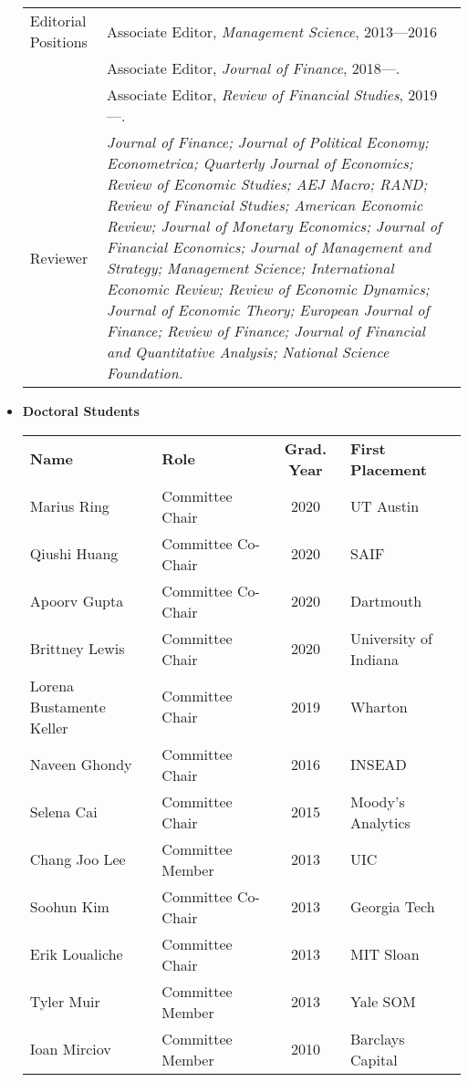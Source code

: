 \documentclass[11pt,letterpaper,serif,overlapped]{res}
\begin{document}
\begin{resume}
\begin{itemize}
\begin{longtable}{lp{11.5cm}}
Editorial Positions & Associate Editor, \emph{Management Science}, 2013---2016\\
  &Associate Editor, \emph{Journal of Finance}, 2018---.\\
  &Associate Editor, \emph{Review of Financial Studies}, 2019---.\\[0.2cm]

Reviewer&
\emph{Journal of Finance; Journal of Political Economy; Econometrica; Quarterly Journal of Economics; Review of Economic Studies; AEJ Macro; RAND;  Review of Financial Studies; American Economic Review;  Journal of Monetary Economics; Journal of Financial Economics; Journal of Management and Strategy; Management Science;  International Economic Review; Review of Economic Dynamics;   Journal of Economic Theory;   European Journal of Finance;   Review of Finance; Journal of Financial and Quantitative Analysis; National Science Foundation.}\\[0.2cm]

 \end{longtable}

\vspace{0.5cm}

\item \textbf{Doctoral Students}\\
\begin{longtable}{llcl}
\textbf{Name} & \textbf{Role} & \textbf{Grad. Year }& \textbf{First Placement}\\
Marius Ring &   Committee Chair & 2020 & UT Austin \\
Qiushi Huang & Committee Co-Chair & 2020 & SAIF\\
Apoorv Gupta  & Committee Co-Chair & 2020 & Dartmouth\\
Brittney Lewis  &Committee Chair & 2020 & University of Indiana  \\
Lorena Bustamente Keller & Committee Chair & 2019& Wharton \\
Naveen Ghondy  &  Committee Chair &2016 & INSEAD \\
Selena Cai  &  Committee Chair &2015 & Moody's Analytics\\
Chang Joo Lee   &  Committee Member &2013 & UIC \\
Soohun Kim   &  Committee  Co-Chair  &2013 & Georgia Tech \\
Erik Loualiche & Committee  Chair&2013    & MIT Sloan \\
Tyler Muir&   Committee Member  &2013& Yale  SOM\\
Ioan Mirciov  & Committee Member&2010 & Barclays Capital\\


\end{longtable}



\end{itemize}





\end{resume}
\end{document}
